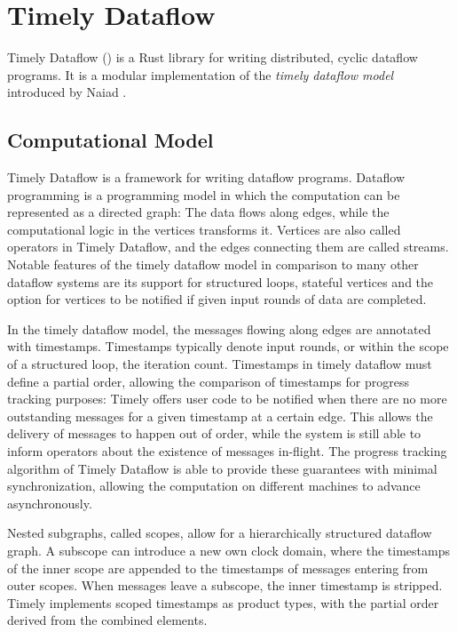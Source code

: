 \chapter{Timely Dataflow}\label{ch:background}

Timely Dataflow \cite{timely} () is a Rust library for writing distributed,
cyclic dataflow programs. It is a modular implementation of the \emph{timely dataflow
model} introduced by Naiad \cite{naiad}. 

\section{Computational Model}

Timely Dataflow is a framework for writing dataflow programs. Dataflow programming
is a programming model in which the computation can be represented as a directed graph:
The data flows along edges, while the computational logic in the vertices transforms it.
Vertices are also called operators in Timely Dataflow, and the edges connecting
them are called streams. Notable features of the timely dataflow model in comparison
to many other dataflow systems are its support for structured loops, stateful
vertices and the option for vertices to be notified if given input rounds of
data are completed. \cite{naiad}

In the timely dataflow model, the messages flowing along edges are annotated with
timestamps. Timestamps typically denote input rounds, or within the scope of a
structured loop, the iteration count. Timestamps in timely dataflow must
define a partial order, allowing the comparison of timestamps for progress
tracking purposes: Timely offers user code to be notified when there are
no more outstanding messages for a given timestamp at a certain edge.
This allows the delivery of messages to happen out of order, while the system
is still able to inform operators about the existence of messages in-flight.
The progress tracking algorithm of Timely Dataflow is able to provide these
guarantees with minimal synchronization, allowing the computation on different
machines to advance asynchronously.

Nested subgraphs, called scopes, allow for a hierarchically structured dataflow graph. 
A subscope can introduce a new own clock domain, where the timestamps of the inner scope are appended to the timestamps of messages
entering from outer scopes. When messages leave a subscope, the inner 
timestamp is stripped. Time\-ly implements scoped timestamps as product types,
with the partial order derived from the combined elements.

